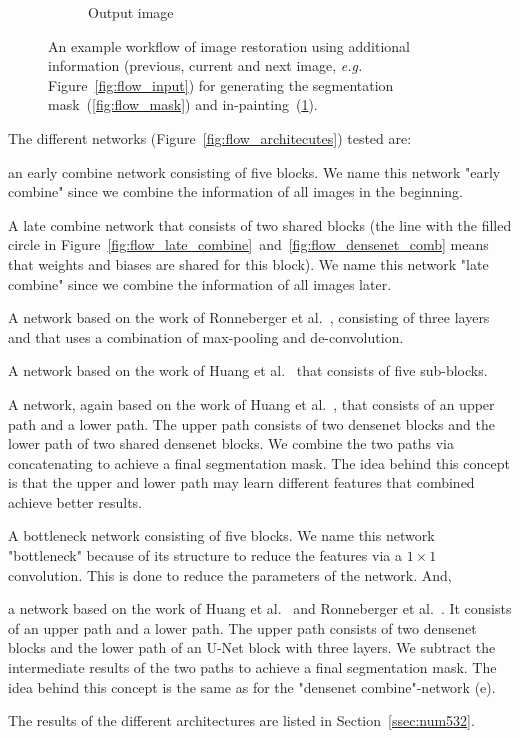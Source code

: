 \begin{figure}[H]
\begin{subfigure}{.3\textwidth}
		\caption[figure]{Output image}
		\label{fig:flow_output}
	\end{subfigure}
	\caption[figure]{An example workflow of image restoration using additional information (previous, current and next image, \textit{e.g.} Figure~\ref{fig:flow_input}) for generating the segmentation mask~(\ref{fig:flow_mask}) and in-painting~(\ref{fig:flow_output}).}
	\label{fig:flow_flow}
\end{figure}


The different networks (Figure~\ref{fig:flow_architecutes}) tested are: \begin{enumerate*}[label=(\alph*)]\item an early combine network consisting of five blocks. We name this network "early combine" since we combine the information of all images in the beginning. \item A late combine network that consists of two shared blocks (the line with the filled circle in Figure~\ref{fig:flow_late_combine}~and~\ref{fig:flow_densenet_comb} means that weights and biases are shared for this block). We name this network "late combine" since we combine the information of all images later. \item A network based on the work of Ronneberger et al.~\cite{Ronneberger15}, consisting of three layers and that uses a combination of max-pooling and de-convolution. \item A network based on the work of Huang et al.~\cite{Huang16} that consists of five sub-blocks. \item A network, again based on the work of Huang et al.~\cite{Huang16}, that consists of an upper path and a lower path. The upper path consists of two densenet blocks and the lower path of two shared densenet blocks. We combine the two paths via concatenating to achieve a final segmentation mask. The idea behind this concept is that the upper and lower path may learn different features that combined achieve better results. \item A bottleneck network consisting of five blocks. We name this network "bottleneck" because of its structure to reduce the features via a $1\times1$ convolution. This is done to reduce the parameters of the network. And, \item a network based on the work of Huang et al.~\cite{Huang16} and Ronneberger et al.~\cite{Ronneberger15}. It consists of an upper path and a lower path. The upper path consists of two densenet blocks and the lower path of an U-Net block with three layers. We subtract the intermediate results of the two paths to achieve a final segmentation mask. The idea behind this concept is the same as for the "densenet combine"-network (e). \end{enumerate*}
The results of the different architectures are listed in Section~\ref{ssec:num532}.

